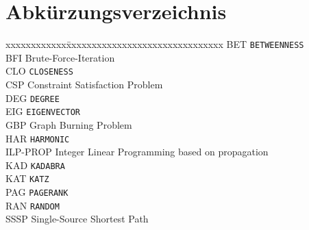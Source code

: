 \section*{Abkürzungsverzeichnis}
\begin{tabbing}
xxxxxxxxxxxx\=xxxxxxxxxxxxxxxxxxxxxxxxxxxxxxx\kill
BET \>\texttt{BETWEENNESS} \\
BFI \>Brute-Force-Iteration \\
CLO \>\texttt{CLOSENESS} \\
CSP \>Constraint Satisfaction Problem \\
DEG \>\texttt{DEGREE} \\
EIG \>\texttt{EIGENVECTOR} \\
GBP \>Graph Burning Problem \\
HAR \>\texttt{HARMONIC} \\
ILP-PROP \>Integer Linear Programming based on propagation \\
KAD \>\texttt{KADABRA} \\
KAT \>\texttt{KATZ} \\
PAG \>\texttt{PAGERANK} \\
RAN \>\texttt{RANDOM} \\
SSSP \>Single-Source Shortest Path \\
\end{tabbing}
